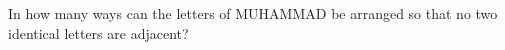 In how many ways can the letters of MUHAMMAD be arranged so that no two identical letters are adjacent?
